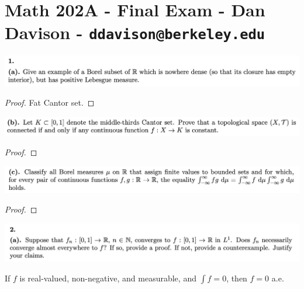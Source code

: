 \section*{Math 202A - Final Exam - Dan Davison - \texttt{ddavison@berkeley.edu}}

\begin{mdframed}
\includegraphics[width=400pt]{img/analysis--berkeley-202a-final-c9d2.png}
\end{mdframed}

\begin{proof}
  Fat Cantor set.
\end{proof}

\begin{mdframed}
\includegraphics[width=400pt]{img/analysis--berkeley-202a-final-4333.png}
\end{mdframed}

\begin{proof}
\end{proof}

\begin{mdframed}
\includegraphics[width=400pt]{img/analysis--berkeley-202a-final-0bf8.png}
\end{mdframed}

\begin{proof}
\end{proof}

\newpage
\begin{mdframed}
\includegraphics[width=400pt]{img/analysis--berkeley-202a-final-04b9.png}
\end{mdframed}

\begin{theorem}\label{bass-8.1}
  If $f$ is real-valued, non-negative, and measurable, and $\int f = 0$, then $f = 0$ a.e.
\end{theorem}

